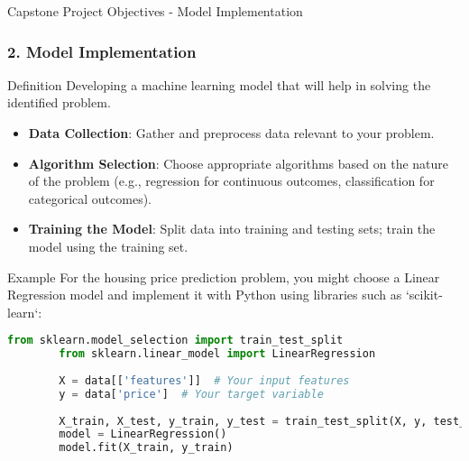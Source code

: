 \documentclass[aspectratio=169]{beamer}
\begin{document}
\begin{frame}[fragile]{Capstone Project Objectives - Model Implementation}
    \frametitle{2. Model Implementation}
    
    \begin{block}{Definition}
        Developing a machine learning model that will help in solving the identified problem.
    \end{block}

    \begin{itemize}
        \item \textbf{Data Collection}: Gather and preprocess data relevant to your problem.
        \item \textbf{Algorithm Selection}: Choose appropriate algorithms based on the nature of the problem (e.g., regression for continuous outcomes, classification for categorical outcomes).
        \item \textbf{Training the Model}: Split data into training and testing sets; train the model using the training set.
    \end{itemize}

    \begin{block}{Example}
        For the housing price prediction problem, you might choose a Linear Regression model and implement it with Python using libraries such as `scikit-learn`:
        \begin{lstlisting}[language=Python]
        from sklearn.model_selection import train_test_split
        from sklearn.linear_model import LinearRegression
        
        X = data[['features']]  # Your input features
        y = data['price']  # Your target variable
        
        X_train, X_test, y_train, y_test = train_test_split(X, y, test_size=0.2)
        model = LinearRegression()
        model.fit(X_train, y_train)
        \end{lstlisting}
    \end{block}
\end{frame}
\end{document}
